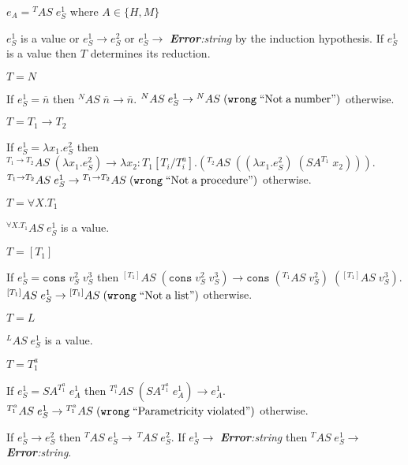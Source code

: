 \begin{case}
\label{as}
$e_{A}={^{T}A}S\;e_{S}^{1}$ where $A\in\lbrace H,M\rbrace$

$e_{S}^{1}$ is a value or $e_{S}^{1}\rightarrow e_{S}^{2}$ or $e_{S}^{1}\rightarrow$ \emph{\textbf{Error}:\;string} by the induction hypothesis.  If $e_{S}^{1}$ is a value then $T$ determines its reduction.
\begin{subcase}
$T=N$

If $e_{S}^{1}=\overline{n}$ then $^{N}AS\;\overline{n}\rightarrow\overline{n}$.  $^{N}AS\;e_{S}^{1}\rightarrow{^{N}A}S\;(\mathtt{wrong}\;\mathrm{``Not\;a\;number"})$ otherwise.
\end{subcase}
\begin{subcase}
$T=T_{1}\rightarrow T_{2}$

If $e_{S}^{1}=\lambda x_{1}.e_{S}^{2}$ then $^{T_{1}\rightarrow T_{2}}AS\;(\lambda x_{1}.e_{S}^{2})\rightarrow\lambda x_{2}:T_{1}[T_{i}/T^{a}_{i}].(^{T_{2}}AS\;((\lambda x_{1}.e_{S}^{2})\;(SA^{T_{1}}\;x_{2})))$.  $^{T_{1}\rightarrow T_{2}}AS\;e_{S}^{1}\rightarrow{^{T_{1}\rightarrow T_{2}}A}S\;(\mathtt{wrong}\;\mathrm{``Not\;a\;procedure"})$ otherwise.
\end{subcase}
\begin{subcase}
$T=\forall X.T_{1}$

$^{\forall X.T_{1}}AS\;e_{S}^{1}$ is a value.
\end{subcase}
\begin{subcase}
$T=[T_{1}]$

If $e_{S}^{1}=\mathtt{cons}\;v_{S}^{2}\;v_{S}^{3}$ then $^{[T_{1}]}AS\;(\mathtt{cons}\;v_{S}^{2}\;v_{S}^{3})\rightarrow\mathtt{cons}\;(^{T_{1}}AS\;v_{S}^{2})\;(^{[T_{1}]}AS\;v_{S}^{3})$.  $^{[T_{1}]}AS\;e_{S}^{1}\rightarrow{^{[T_{1}]}A}S\;(\mathtt{wrong}\;\mathrm{``Not\;a\;list"})$ otherwise.
\end{subcase}
\begin{subcase}
$T=L$

$^{L}AS\;e_{S}^{1}$ is a value.
\end{subcase}
\begin{subcase}
$T=T_{1}^{a}$

If $e_{S}^{1}=SA^{T_{1}^{a}}\;e_{A}^{1}$ then $^{T_{1}^{a}}AS\;(SA^{T_{1}^{a}}\;e_{A}^{1})\rightarrow e_{A}^{1}$.  $^{T_{1}^{a}}AS\;e_{S}^{1}\rightarrow{^{T_{1}^{a}}A}S\;(\mathtt{wrong}\;\mathrm{``Parametricity\;violated"})$ otherwise.
\end{subcase}
If $e_{S}^{1}\rightarrow e_{S}^{2}$ then $^{T}AS\;e_{S}^{1}\rightarrow\,^{T}AS\;e_{S}^{2}$.  If $e_{S}^{1}\rightarrow$ \emph{\textbf{Error}:\;string} then $^{T}AS\;e_{S}^{1}\rightarrow$ \emph{\textbf{Error}:\;string}.
\end{case}